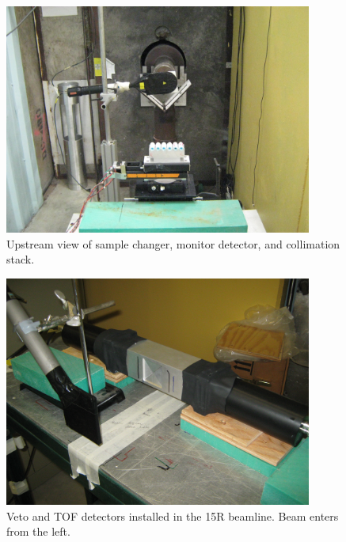 \begin{figure}[tb]
    \centering
    \includegraphics[width=0.9\textwidth]{figures/UpstreamTowardCollimator.jpg}
    \caption[Sample changer, monitor detector, and collimation stack]
    {Upstream view of sample changer, monitor detector, and collimation stack.}
    \label{BeamlineSampleChanger}
\end{figure}
\begin{figure}[tb]
    \centering
    \includegraphics[width=0.9\textwidth]{figures/VetoAndTOFDetectors.jpg}
    \caption[Veto and TOF detectors installed in the 15R beamline]
    {Veto and TOF detectors installed in the 15R beamline. Beam enters from the left.}
    \label{VetoAndTOFDetectors}
\end{figure}
